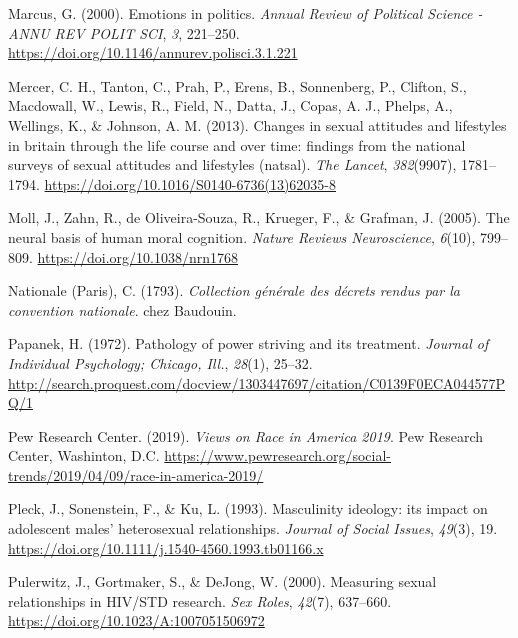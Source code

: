 \documentclass[
  english,
  donotrepeattitle,doc, 12pt, a4paper,floatsintext]{apa7}
\newlength{\cslhangindent}
\newlength{\cslentryspacingunit} %
\newenvironment{CSLReferences}[2] %
 {%
  \setlength{\parindent}{0pt}
  \ifodd #1
  \let\oldpar\par
  \def\par{\hangindent=\cslhangindent\oldpar}
  \fi
  \setlength{\parskip}{#2\cslentryspacingunit}
 }%
 {}
\begin{document}
\begin{CSLReferences}{1}{0}
\leavevmode{}%
Marcus, G. (2000). Emotions in politics. \emph{Annual Review of Political Science - ANNU REV POLIT SCI}, \emph{3}, 221--250. \url{https://doi.org/10.1146/annurev.polisci.3.1.221}

\leavevmode{}%
Mercer, C. H., Tanton, C., Prah, P., Erens, B., Sonnenberg, P., Clifton, S., Macdowall, W., Lewis, R., Field, N., Datta, J., Copas, A. J., Phelps, A., Wellings, K., \& Johnson, A. M. (2013). Changes in sexual attitudes and lifestyles in britain through the life course and over time: findings from the national surveys of sexual attitudes and lifestyles (natsal). \emph{The Lancet}, \emph{382}(9907), 1781--1794. \url{https://doi.org/10.1016/S0140-6736(13)62035-8}

\leavevmode{}%
Moll, J., Zahn, R., de Oliveira-Souza, R., Krueger, F., \& Grafman, J. (2005). The neural basis of human moral cognition. \emph{Nature Reviews Neuroscience}, \emph{6}(10), 799--809. \url{https://doi.org/10.1038/nrn1768}

\leavevmode{}%
Nationale (Paris), C. (1793). \emph{Collection générale des décrets rendus par la convention nationale}. chez Baudouin.

\leavevmode{}%
Papanek, H. (1972). Pathology of power striving and its treatment. \emph{Journal of Individual Psychology; Chicago, Ill.}, \emph{28}(1), 25--32. \url{http://search.proquest.com/docview/1303447697/citation/C0139F0ECA044577PQ/1}

\leavevmode{}%
Pew Research Center. (2019). \emph{Views on Race in America 2019}. Pew Research Center, Washinton, D.C. \url{https://www.pewresearch.org/social-trends/2019/04/09/race-in-america-2019/}

\leavevmode{}%
Pleck, J., Sonenstein, F., \& Ku, L. (1993). Masculinity ideology: its impact on adolescent males' heterosexual relationships. \emph{Journal of Social Issues}, \emph{49}(3), 19. \url{https://doi.org/10.1111/j.1540-4560.1993.tb01166.x}

\leavevmode{}%
Pulerwitz, J., Gortmaker, S., \& DeJong, W. (2000). Measuring sexual relationships in HIV/STD research. \emph{Sex Roles}, \emph{42}(7), 637--660. \url{https://doi.org/10.1023/A:1007051506972}


\end{CSLReferences}
\end{document}
